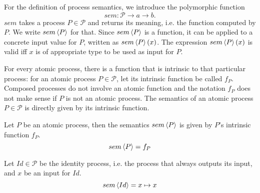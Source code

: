 For the definition of process semantics, we introduce the polymorphic function 
\begin{equation*}
  sem \colon \mathcal{P} \to a \to b.
\end{equation*}
$sem$ takes a process $P \in \mathcal{P}$ and returns its meaning, i.e. the function computed by $P$. We write $sem \left\langle P \right\rangle$ for that. Since $sem \left\langle P \right\rangle$ is a function, it can be applied to a concrete input value for $P$, written as $sem \left\langle P \right\rangle \left( x \right)$. The expression $sem \left\langle P \right\rangle \left( x \right)$ is valid iff $x$ is of appropriate type to be used as input for $P$.

For every atomic process, there is a function that is intrinsic to that particular process: for an atomic process $P \in \mathcal{P}$, let its intrinsic function be called $f_P$. Composed processes do not involve an atomic function and the notation $f_P$ does not make sense if $P$ is not an atomic process. The semantics of an atomic process $P \in \mathcal{P}$ is directly given by its intrinsic function.
\begin{definition}
  \label{def:sem_atomic}
  Let $P$ be an atomic process, then the semantics $sem \left\langle P \right\rangle$ is given by $P$'s intrinsic function $f_P$.
  \begin{equation*}
    \label{eqn:sem_atomic}
    sem \left\langle P \right\rangle = f_P
  \end{equation*}
  \vspace*{-0.5em}
  \hfill\qedsymbol
\end{definition}

\begin{definition}
\label{def:sem_id}
Let $Id \in \mathcal{P}$ be the identity process, i.e. the process that always outputs its input, and $x$ be an input for $Id$.
\begin{equation*}
  \label{eqn:sem_id}
  sem \left\langle Id \right\rangle = x \mapsto x
\end{equation*}
  \vspace*{-0.5em}
  \hfill\qedsymbol
\end{definition}


